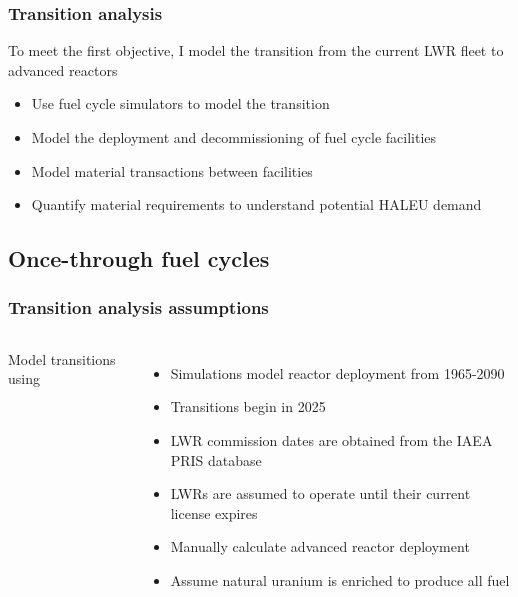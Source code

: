 \begin{frame}
    \frametitle{Transition analysis}
    To meet the first objective, I model the transition from the current 
    \gls{LWR} fleet to advanced reactors
    \begin{itemize}
        \item Use fuel cycle simulators to model the transition
        \item Model the deployment and decommissioning of fuel cycle facilities 
        \item Model material transactions between facilities
        \item Quantify material requirements to understand potential \gls{HALEU}
              demand
    \end{itemize}

\end{frame}

\subsection{Once-through fuel cycles}
\begin{frame}
    \frametitle{Transition analysis assumptions}
    \begin{columns}
        
    \column[t]{6cm}
    \vspace{-0.9cm}
    

        \column[t]{4.5cm}
        Model transitions using \Cyclus \cite{huff_fundamental_2016}
        \begin{itemize}
            \item Simulations model reactor deployment from 1965-2090
            \item Transitions begin in 2025
            \item<2-> \gls{LWR} commission dates are obtained from the IAEA PRIS
                database \cite{noauthor_power_1989}
            \item<2-> \glspl{LWR} are assumed to operate until their current license 
                expires
            \item<3-> Manually calculate advanced reactor deployment
            \item<3-> Assume natural uranium is enriched to produce all 
                  fuel
        \end{itemize}

\end{columns}
\end{frame}

